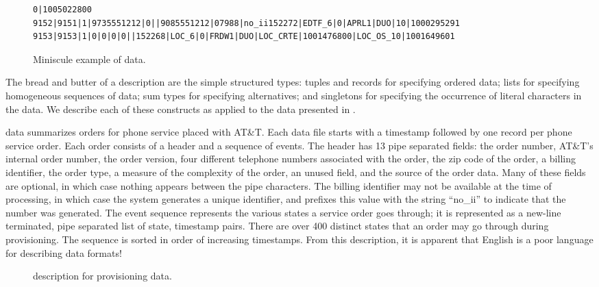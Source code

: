 \begin{figure*}
{\scriptsize
\begin{verbatim}
0|1005022800
9152|9151|1|9735551212|0||9085551212|07988|no_ii152272|EDTF_6|0|APRL1|DUO|10|1000295291
9153|9153|1|0|0|0|0||152268|LOC_6|0|FRDW1|DUO|LOC_CRTE|1001476800|LOC_OS_10|1001649601
\end{verbatim}
}
  \caption{Miniscule example of \dibbler{} data.}
  \label{figure:dibbler-records}
\end{figure*}

The bread and butter of a \padsml{} description are the simple
structured types: tuples and records for specifying ordered data;
lists for specifying homogeneous sequences of data; sum types for
specifying alternatives; and singletons for specifying the occurrence
of literal characters in the data.  We describe each of these
constructs as applied to the \dibbler{} data presented in
.

\dibbler{} data summarizes orders for phone service placed with AT\&T.
Each \dibbler{} data file starts with a timestamp followed by one
record per phone service order.  Each order consists of a header and a
sequence of events.  The header has 13 pipe separated fields: the
order number, AT\&T's internal order number, the order version, four
different telephone numbers associated with the order, the zip code of
the order, a billing identifier, the order type, a measure of the
complexity of the order, an unused field, and the source of the order
data.  Many of these fields are optional, in which case nothing
appears between the pipe characters.  The billing identifier may not
be available at the time of processing, in which case the system
generates a unique identifier, and prefixes this value with the string
``no\_ii'' to indicate that the number was generated. The event
sequence represents the various states a service order goes through;
it is represented as a new-line terminated, pipe separated list of
state, timestamp pairs.  There are over 400 distinct states that an
order may go through during provisioning.  The sequence is sorted in
order of increasing timestamps.  From this description, it is apparent
that English is a poor language for describing data formats!

\begin{figure}

  \caption{\padsml{} description for \dibbler{} provisioning data.}
  \label{figure:sirius_pml}
\end{figure}

